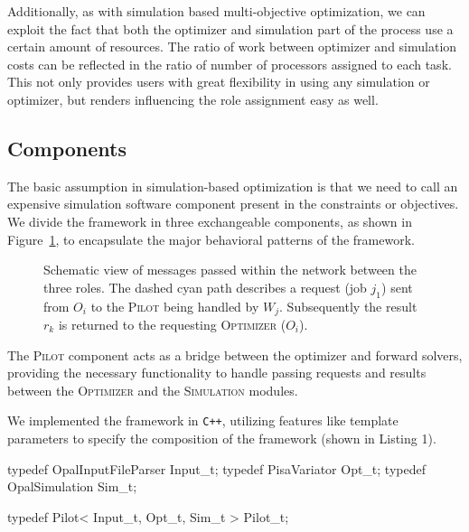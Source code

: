\documentclass[%
reprint,
amsmath,amssymb,
aps,
]{revtex4-1}
\begin{document}
Additionally, as with simulation based multi-objective optimization, we can
  exploit the fact that both the optimizer and simulation part of the process
  use a certain amount of resources.
The ratio of work between optimizer and simulation costs can be reflected in
  the ratio of number of processors assigned to each task.
This not only provides users with  great flexibility in using any simulation
  or optimizer, but renders influencing the role assignment easy as well.


\subsection{Components}

The basic assumption in simulation-based optimization is that we need to
  call an expensive simulation software component present in the
  constraints or objectives.
We divide the framework in three exchangeable components, as shown in
  Figure~\ref{fig:opt-framework-layout}, to encapsulate the major behavioral
  patterns of the framework.
%
\begin{figure}
  \centering
  \scalebox{0.85}{
  \begin{tikzpicture}[text=black]
  
  \end{tikzpicture}
}
  

  \caption{Schematic view of messages passed within the network between the
    three roles.
  The dashed cyan path describes a request (job $j_1$) sent from $O_i$ to the
  \textsc{Pilot} being handled by $W_j$. Subsequently the result $r_k$ is
  returned to the requesting \textsc{Optimizer} ($O_i$).}
  \label{fig:opt-framework-layout}
\end{figure}

%
The \textsc{Pilot} component acts as a bridge between the optimizer and
  forward solvers, providing the necessary functionality to handle passing
  requests and results between the \textsc{Optimizer} and the
  \textsc{Simulation} modules.

We implemented the framework in \texttt{C++}, utilizing features like template
  parameters to specify the composition of the framework (shown in Listing 1).

\begin{code}
typedef OpalInputFileParser Input_t;
typedef PisaVariator        Opt_t;
typedef OpalSimulation      Sim_t;

typedef Pilot< Input_t, Opt_t, Sim_t > Pilot_t;
\end{code}
\end{document}
